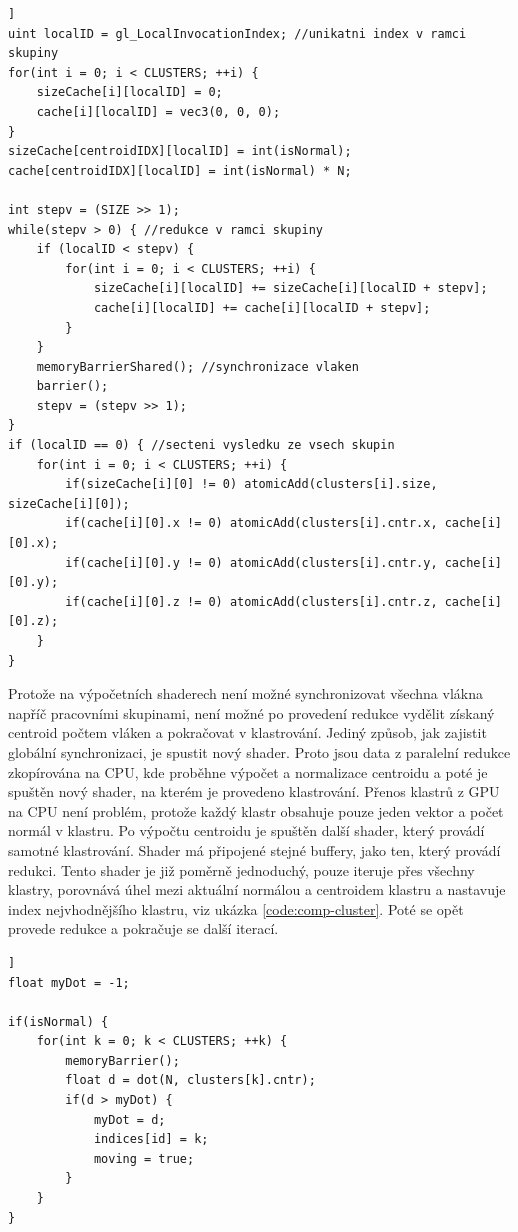 \documentclass[11pt,twoside,a4paper]{book}
\begin{document}
\begin{lstlisting}[caption={Paralelní redukce na výpočetních shaderech.},firstnumber=1,label={code:comp-reduction},float=[ht]]
uint localID = gl_LocalInvocationIndex; //unikatni index v ramci skupiny
for(int i = 0; i < CLUSTERS; ++i) {
	sizeCache[i][localID] = 0;
	cache[i][localID] = vec3(0, 0, 0);
}
sizeCache[centroidIDX][localID] = int(isNormal);
cache[centroidIDX][localID] = int(isNormal) * N;

int stepv = (SIZE >> 1); 
while(stepv > 0) { //redukce v ramci skupiny
	if (localID < stepv) {
		for(int i = 0; i < CLUSTERS; ++i) {
			sizeCache[i][localID] += sizeCache[i][localID + stepv];
			cache[i][localID] += cache[i][localID + stepv];
		}
	}
	memoryBarrierShared(); //synchronizace vlaken
	barrier();
	stepv = (stepv >> 1);
}
if (localID == 0) { //secteni vysledku ze vsech skupin
	for(int i = 0; i < CLUSTERS; ++i) {
		if(sizeCache[i][0] != 0) atomicAdd(clusters[i].size, sizeCache[i][0]);
		if(cache[i][0].x != 0) atomicAdd(clusters[i].cntr.x, cache[i][0].x);
		if(cache[i][0].y != 0) atomicAdd(clusters[i].cntr.y, cache[i][0].y);
		if(cache[i][0].z != 0) atomicAdd(clusters[i].cntr.z, cache[i][0].z);
	}
}
\end{lstlisting}


Protože na výpočetních shaderech není možné synchronizovat všechna vlákna napříč pracovními skupinami, není možné po provedení redukce vydělit získaný centroid počtem vláken a pokračovat v klastrování. Jediný způsob, jak zajistit globální synchronizaci, je spustit nový shader. Proto jsou data z paralelní redukce zkopírována na CPU, kde proběhne výpočet a normalizace centroidu a poté je spuštěn nový shader, na kterém je provedeno klastrování. Přenos klastrů z GPU na CPU není problém, protože každý klastr obsahuje pouze jeden vektor a počet normál v klastru. Po výpočtu centroidu je spuštěn další shader, který provádí samotné klastrování. Shader má připojené stejné buffery, jako ten, který provádí redukci. Tento shader je již poměrně jednoduchý, pouze  iteruje přes všechny klastry, porovnává úhel mezi aktuální normálou a centroidem klastru a nastavuje index nejvhodnějšího klastru, viz ukázka \ref{code:comp-cluster}. Poté se opět provede redukce a pokračuje se další iterací.

\begin{lstlisting}[caption={K-means klastrování na výpočetních shaderech.},firstnumber=1,label={code:comp-cluster},float=[ht]]
float myDot = -1;

if(isNormal) {
	for(int k = 0; k < CLUSTERS; ++k) {
		memoryBarrier();
		float d = dot(N, clusters[k].cntr);
		if(d > myDot) {
			myDot = d;
			indices[id] = k;
			moving = true;
		}
	}
}
\end{lstlisting}
\end{document}

